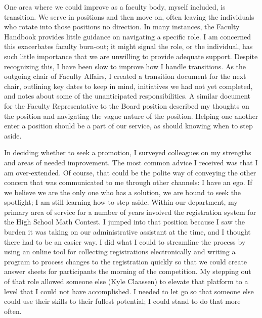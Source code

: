 \documentclass[
  letterpaper,
  DIV=11,
  numbers=noendperiod]{scrreprt}
\begin{document}
One area where we could improve as a faculty body, myself included, is
transition. We serve in positions and then move on, often leaving the
individuals who rotate into those positions no direction. In many
instances, the Faculty Handbook provides little guidance on navigating a
specific role. I am concerned this exacerbates faculty burn-out; it
might signal the role, or the individual, has such little importance
that we are unwilling to provide adequate support. Despite recognizing
this, I have been slow to improve how I handle transitions. As the
outgoing chair of Faculty Affairs, I created a transition document for
the next chair, outlining key dates to keep in mind, initiatives we had
not yet completed, and notes about some of the unanticipated
responsibilities. A similar document for the Faculty Representative to
the Board position described my thoughts on the position and navigating
the vague nature of the position. Helping one another enter a position
should be a part of our service, as should knowing when to step aside.

In deciding whether to seek a promotion, I surveyed colleagues on my
strengths and areas of needed improvement. The most common advice I
received was that I am over-extended. Of course, that could be the
polite way of conveying the other concern that was communicated to me
through other channels: I have an ego. If we believe we are the only one
who has a solution, we are bound to seek the spotlight; I am still
learning how to step aside. Within our department, my primary area of
service for a number of years involved the registration system for the
High School Math Contest. I jumped into that position because I saw the
burden it was taking on our administrative assistant at the time, and I
thought there had to be an easier way. I did what I could to streamline
the process by using an online tool for collecting registrations
electronically and writing a program to process changes to the
registration quickly so that we could create answer sheets for
participants the morning of the competition. My stepping out of that
role allowed someone else (Kyle Claassen) to elevate that platform to a
level that I could not have accomplished. I needed to let go so that
someone else could use their skills to their fullest potential; I could
stand to do that more often.
\end{document}
